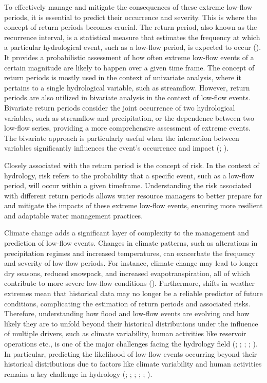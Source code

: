 \documentclass[
]{krantz}
\begin{document}
To effectively manage and mitigate the consequences of these extreme low-flow periods, it is essential to predict their occurrence and severity. This is where the concept of return periods becomes crucial. The return period, also known as the recurrence interval, is a statistical measure that estimates the frequency at which a particular hydrological event, such as a low-flow period, is expected to occur (\citet{Stedinger1993}). It provides a probabilistic assessment of how often extreme low-flow events of a certain magnitude are likely to happen over a given time frame. The concept of return periods is mostly used in the context of univariate analysis, where it pertains to a single hydrological variable, such as streamflow. However, return periods are also utilized in bivariate analysis in the context of low-flow events. Bivariate return periods consider the joint occurrence of two hydrological variables, such as streamflow and precipitation, or the dependence between two low-flow series, providing a more comprehensive assessment of extreme events. The bivariate approach is particularly useful when the interaction between variables significantly influences the event's occurrence and impact (\citet{Graler2013}; \citet{Salvadori2007}).

Closely associated with the return period is the concept of risk. In the context of hydrology, risk refers to the probability that a specific event, such as a low-flow period, will occur within a given timeframe. Understanding the risk associated with different return periods allows water resource managers to better prepare for and mitigate the impacts of these extreme low-flow events, ensuring more resilient and adaptable water management practices.

Climate change adds a significant layer of complexity to the management and prediction of low-flow events. Changes in climate patterns, such as alterations in precipitation regimes and increased temperatures, can exacerbate the frequency and severity of low-flow periods. For instance, climate change may lead to longer dry seasons, reduced snowpack, and increased evapotranspiration, all of which contribute to more severe low-flow conditions (\citet{Katz1992}). Furthermore, shifts in weather extremes mean that historical data may no longer be a reliable predictor of future conditions, complicating the estimation of return periods and associated risks. Therefore, understanding how flood and low-flow events are evolving and how likely they are to unfold beyond their historical distributions under the influence of multiple drivers, such as climate variability, human activities like reservoir operations etc., is one of the major challenges facing the hydrology field (\citet{Lopez2013}; \citet{Kam2016}; \citet{Gai2019}; \citet{Jiang2021}; \citet{Slater2021a}). In particular, predicting the likelihood of low-flow events occurring beyond their historical distributions due to factors like climate variability and human activities remains a key challenge in hydrology (\citet{Lopez2013}; \citet{Kam2016}; \citet{Gai2019}; \citet{Jiang2021}; \citet{Slater2021a}; \citet{Wang2022}).
\end{document}
